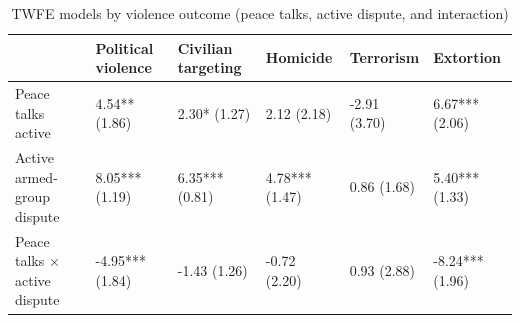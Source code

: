 \begin{table}

\caption{\label{tab:violence_twfe_interaction}TWFE models by violence outcome (peace talks, active dispute, and interaction)}
\centering
\begin{tabular}[t]{llllll}
\toprule
 & Political violence & Civilian targeting & Homicide & Terrorism & Extortion\\
\midrule
Peace talks active & 4.54** (1.86) & 2.30* (1.27) & 2.12 (2.18) & -2.91 (3.70) & 6.67*** (2.06)\\
Active armed-group dispute & 8.05*** (1.19) & 6.35*** (0.81) & 4.78*** (1.47) & 0.86 (1.68) & 5.40*** (1.33)\\
Peace talks × active dispute & -4.95*** (1.84) & -1.43 (1.26) & -0.72 (2.20) & 0.93 (2.88) & -8.24*** (1.96)\\
\bottomrule
\end{tabular}
\end{table}
